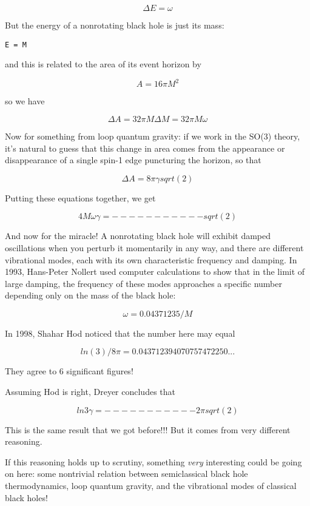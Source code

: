 $$
\Delta  E = \omega  
$$
    
But the energy of a nonrotating black hole is just its mass:

\begin{verbatim}
E = M
\end{verbatim}
    
and this is related to the area of its event horizon by

$$
A = 16 \pi  M^{2}
$$
    
so we have

$$
\Delta  A = 32 \pi  M \Delta  M

        = 32 \pi  M \omega 
$$
    
Now for something from loop quantum gravity: if we work in the
SO(3) theory, it's natural to guess that this change in area
comes from the appearance or disappearance of a single spin-1
edge puncturing the horizon, so that

$$
\Delta  A = 8 \pi  \gamma  sqrt(2)
$$
    
Putting these equations together, we get

$$
         4 M \omega          
\gamma  = -----------
          sqrt(2)
$$
    
And now for the miracle!  A nonrotating black hole will exhibit damped
oscillations when you perturb it momentarily in any way, and there are
different vibrational modes, each with its own characteristic frequency
and damping.  In 1993, Hans-Peter Nollert used computer calculations to show
that in the limit of large damping, the frequency of these modes
approaches a specific number depending only on the mass of the black
hole:

$$
\omega  = 0.04371235 / M
$$
    
In 1998, Shahar Hod noticed that the number here may equal

$$
ln(3) / 8 \pi  = 0.043712394070757472250... 
$$
    
They agree to 6 significant figures!  

Assuming Hod is right, Dreyer concludes that
   
$$
            ln 3
\gamma  = -----------
        2 \pi  sqrt(2)
$$
    
This is the same result that we got before!!!  But it comes from very
different reasoning.  

If this reasoning holds up to scrutiny, something \emph{very} interesting
could be going on here: some nontrivial relation between semiclassical
black hole thermodynamics, loop quantum gravity, and the vibrational
modes of classical black holes!

